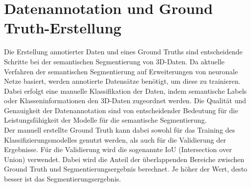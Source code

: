 \section{Datenannotation und Ground Truth-Erstellung}

Die Erstellung annotierter Daten und eines Ground Truths sind entscheidende
Schritte bei der semantischen Segmentierung von 3D-Daten. Da aktuelle Verfahren
der semantischen Segmentierung auf Erweiterungen von neuronale Netze basiert,
werden annotierte Datensätze benötigt, um diese zu trainieren. Dabei erfolgt
eine manuelle Klassifikation der Daten, indem semantische Labels oder
Klasseninformationen den 3D-Daten zugeordnet werden. Die Qualität und
Genauigkeit der Datenannotation sind von entscheidender Bedeutung für die
Leistungsfähigkeit der Modelle für die semantische Segmentierung.
\cite{BROSTOW200988,Zlateski_2018_CVPR}
\\Der manuell erstellte Ground Truth kann dabei sowohl für das Training des
Klassifizierungsmodelles genutzt werden, als auch für die Validierung der
Ergebnisse. Für die Validierung wird die sogenannte IoU (Intersection over
Union) verwendet. Dabei wird die Anteil der überlappenden Bereiche zwischen
Ground Truth und Segmentierungsergebnis berechnet. Je höher der Wert, desto
besser ist das Segmentierungsergebnis. \cite{9000872}